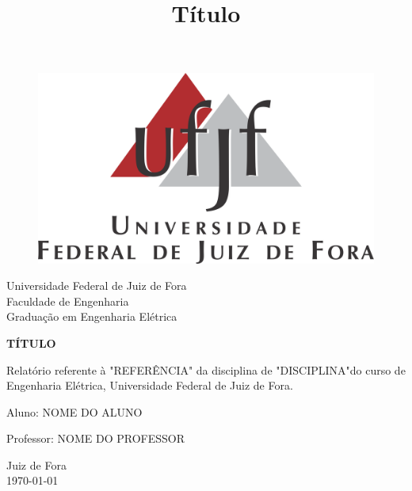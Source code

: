 \documentclass[a4paper, 12pt]{article}
\begin{document}

\begin{titlepage}
	\begin{center}
	
	\begin{figure}[!ht]
	\centering
	\includegraphics[width=0.5\linewidth]{figuras/ufjf.png}
	\end{figure}

		\Huge{Universidade Federal de Juiz de Fora}\\
		\large{Faculdade de Engenharia}\\ 
		\large{Graduação em Engenharia Elétrica}\\ 
\vspace{15pt}
        
        \vspace{85pt}
        
		\textbf{\LARGE{TÍTULO}}
		\title{\large{Título}}
			
	\end{center}
\vspace{1,5cm}
	
	\begin{flushright}

   \begin{list}{}{
      \setlength{\leftmargin}{4.5cm}
      \setlength{\rightmargin}{0cm}
      \setlength{\labelwidth}{0pt}
      \setlength{\labelsep}{\leftmargin}}
      
      \item Relatório referente à "REFERÊNCIA" da disciplina de "DISCIPLINA"do curso de Engenharia Elétrica, Universidade Federal de Juiz de Fora.
      \begin{list}{}{
      \setlength{\leftmargin}{0cm}
      \setlength{\rightmargin}{0cm}
      \setlength{\labelwidth}{0pt}
      \setlength{\labelsep}{\leftmargin}}

			\item Aluno: NOME DO ALUNO \\ \vspace{15pt}
            \item Professor: NOME DO PROFESSOR \

      \end{list}
   \end{list}
\end{flushright}
\vspace{1cm}
\begin{center}
		\vspace{\fill}
		 Juiz de Fora\\
		 \today
			\end{center}
\end{titlepage}
\end{document}
